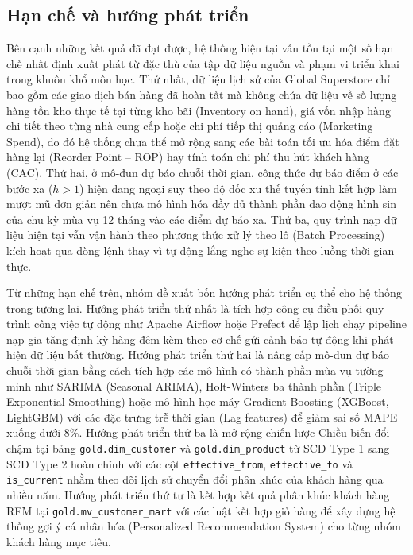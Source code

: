 \subsection{Hạn chế và hướng phát triển}

Bên cạnh những kết quả đã đạt được, hệ thống hiện tại vẫn tồn tại một số hạn chế nhất định xuất phát từ đặc thù của tập dữ liệu nguồn và phạm vi triển khai trong khuôn khổ môn học. Thứ nhất, dữ liệu lịch sử của Global Superstore chỉ bao gồm các giao dịch bán hàng đã hoàn tất mà không chứa dữ liệu về số lượng hàng tồn kho thực tế tại từng kho bãi (Inventory on hand), giá vốn nhập hàng chi tiết theo từng nhà cung cấp hoặc chi phí tiếp thị quảng cáo (Marketing Spend), do đó hệ thống chưa thể mở rộng sang các bài toán tối ưu hóa điểm đặt hàng lại (Reorder Point -- ROP) hay tính toán chi phí thu hút khách hàng (CAC). Thứ hai, ở mô-đun dự báo chuỗi thời gian, công thức dự báo điểm ở các bước xa ($h > 1$) hiện đang ngoại suy theo độ dốc xu thế tuyến tính kết hợp làm mượt mũ đơn giản nên chưa mô hình hóa đầy đủ thành phần dao động hình sin của chu kỳ mùa vụ 12 tháng vào các điểm dự báo xa. Thứ ba, quy trình nạp dữ liệu hiện tại vẫn vận hành theo phương thức xử lý theo lô (Batch Processing) kích hoạt qua dòng lệnh thay vì tự động lắng nghe sự kiện theo luồng thời gian thực.

Từ những hạn chế trên, nhóm đề xuất bốn hướng phát triển cụ thể cho hệ thống trong tương lai. Hướng phát triển thứ nhất là tích hợp công cụ điều phối quy trình công việc tự động như Apache Airflow hoặc Prefect để lập lịch chạy pipeline nạp gia tăng định kỳ hàng đêm kèm theo cơ chế gửi cảnh báo tự động khi phát hiện dữ liệu bất thường. Hướng phát triển thứ hai là nâng cấp mô-đun dự báo chuỗi thời gian bằng cách tích hợp các mô hình có thành phần mùa vụ tường minh như SARIMA (Seasonal ARIMA), Holt-Winters ba thành phần (Triple Exponential Smoothing) hoặc mô hình học máy Gradient Boosting (XGBoost, LightGBM) với các đặc trưng trễ thời gian (Lag features) để giảm sai số MAPE xuống dưới 8\%. Hướng phát triển thứ ba là mở rộng chiến lược Chiều biến đổi chậm tại bảng \texttt{gold.dim\_customer} và \texttt{gold.dim\_product} từ SCD Type 1 sang SCD Type 2 hoàn chỉnh với các cột \texttt{effective\_from}, \texttt{effective\_to} và \texttt{is\_current} nhằm theo dõi lịch sử chuyển đổi phân khúc của khách hàng qua nhiều năm. Hướng phát triển thứ tư là kết hợp kết quả phân khúc khách hàng RFM tại \texttt{gold.mv\_customer\_mart} với các luật kết hợp giỏ hàng để xây dựng hệ thống gợi ý cá nhân hóa (Personalized Recommendation System) cho từng nhóm khách hàng mục tiêu.
